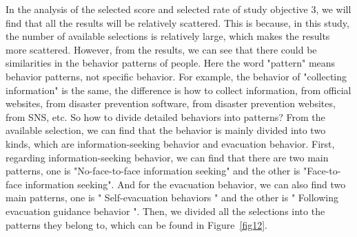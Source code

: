 In the analysis of the selected score and selected rate of study objective 3, we will find that all the results will be relatively scattered. This is because, in this study, the number of available selections is relatively large, which makes the results more scattered. However, from the results, we can see that there could be similarities in the behavior patterns of people. Here the word "pattern" means behavior patterns, not specific behavior. For example, the behavior of  "collecting information" is the same, the difference is how to collect information, from official websites, from disaster prevention software, from disaster prevention websites, from SNS, etc. So how to divide detailed behaviors into patterns? From the available selection, we can find that the behavior is mainly divided into two kinds, which are information-seeking behavior and evacuation behavior. First, regarding information-seeking behavior, we can find that there are two main patterns, one is "No-face-to-face information seeking" and the other is "Face-to-face information seeking". And for the evacuation behavior, we can also find two main patterns, one is " Self-evacuation behaviors " and the other is " Following evacuation guidance behavior ". Then, we divided all the selections into the patterns they belong to, which can be found in Figure~\ref{fig12}.


